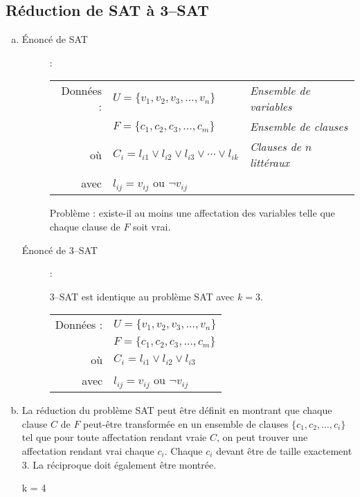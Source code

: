 \subsection{Réduction de SAT à 3--SAT}
\begin{enumerate}[(a)]
\item \begin{description}
\item[Énoncé de SAT] : \\
\begin{tabular}{r l l}
Données : & $ U = \lbrace v_1, v_2, v_3, \ldots, v_n \rbrace $ & \textit{Ensemble de variables}\\
& $ F = \lbrace c_1, c_2, c_3, \ldots, c_m \rbrace $ & \textit{Ensemble de clauses}\\
où & $ C_i = l_{i1} \vee l_{i2} \vee l_{i3} \vee \cdots \vee l_{ik} $ & \textit{Clauses de $n$ littéraux}\\
avec & $ l_{ij} = v_{ij}$ ou $ \neg v_{ij} $ &\\
\end{tabular}

Problème : existe-il au moins une affectation des variables telle que chaque clause de $F$ soit vrai.

\item [Énoncé de 3--SAT] : 

3--SAT est identique au problème SAT avec $k = 3$.\\
\begin{tabular}{r l}
Données : & $ U = \lbrace v_1, v_2, v_3, \ldots, v_n \rbrace $\\
& $ F = \lbrace c_1, c_2, c_3, \ldots, c_m \rbrace $\\
où & $ C_i = l_{i1} \vee l_{i2} \vee l_{i3} $\\
avec & $ l_{ij} = v_{ij}$ ou $ \neg v_{ij} $\\
\end{tabular}
\end{description}
\item La réduction du problème SAT peut être définit en montrant que chaque clause $C$ de $F$ peut-être transformée en un ensemble de clauses $\lbrace c_1, c_2, \ldots, c_i \rbrace$ tel que pour toute affectation rendant vraie $C$, on peut trouver une affectation rendant vrai chaque $c_i$. Chaque $c_i$ devant être de taille exactement 3. La réciproque doit également être montrée.

\begin{description}
\item[k = 4]


\end{description}
\end{enumerate}
